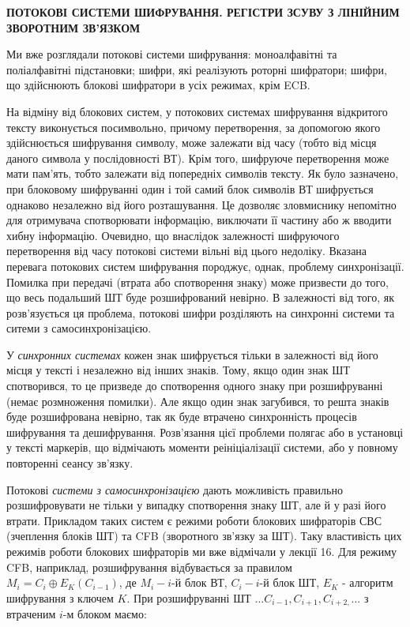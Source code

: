 \documentclass[a4paper]{article}
\newcounter{}
\begin{document}
{\centering\bfseries
ПОТОКОВІ  СИСТЕМИ  ШИФРУВАННЯ.  РЕГІСТРИ ЗСУВУ  З  ЛІНІЙНИМ  ЗВОРОТНИМ  ЗВ’ЯЗКОМ
\par}


\bigskip


\bigskip

Ми вже розглядали потокові системи шифрування: моноалфавітні та поліалфавітні
підстановки; шифри, які реалізують роторні шифратори; шифри, що здійснюють
блокові шифратори в  усіх режимах, крім ECB.

На відміну від блокових систем, у потокових системах шифрування відкритого
тексту виконується посимвольно, причому перетворення, за допомогою якого
здійснюється шифрування символу, може залежати від часу (тобто від місця даного
символа у послідовності ВТ). Крім того, шифруюче перетворення може мати
пам’ять, тобто залежати від попередніх символів тексту. Як було зазначено, при
блоковому шифруванні один і той самий блок символів ВТ шифрується однаково
незалежно від його розташування. Це дозволяє зловмиснику непомітно для
отримувача спотворювати інформацію, виключати її частину або ж вводити хибну
інформацію. Очевидно, що внаслідок залежності шифруючого перетворення від часу
потокові системи вільні від цього недоліку. Вказана перевага потокових систем
шифрування породжує, однак, проблему синхронізації. Помилка при передачі
(втрата або спотворення знаку) може призвести до того, що весь подальший ШТ
буде розшифрований невірно. В залежності від того, як розв’язується ця
проблема, потокові шифри розділяють на синхронні системи та ситеми з
самосинхронізацією.

У \textit{синхронних системах}\textbf{ }кожен знак шифрується тільки в
залежності від його місця у тексті і незалежно від інших знаків. Тому, якщо
один знак ШТ спотворився, то це призведе до спотворення одного знаку при
розшифруванні (немає розмноження помилки). Але якщо один знак загубився, то
решта знаків буде розшифрована невірно, так як буде втрачено синхронність
процесів шифрування та дешифрування. Розв’язання цієї проблеми полягає або в
установці у тексті маркерів, що відмічають моменти реініціалізації системи, або
у повному повторенні сеансу зв’язку.

Потокові \textit{системи з самосинхронізацією} дають можливість правильно
розшифровувати не тільки у випадку спотворення знаку ШТ, але й у разі його
втрати. Прикладом таких систем є режими роботи блокових шифраторів СВС 
(зчеплення блоків ШТ)  та CFB (зворотного зв’язку за ШТ). Таку властивість цих
режимів роботи блокових шифраторів ми вже відмічали у лекції 16. Для режиму
CFB, наприклад, розшифрування відбувається за правилом  
${M_{{i}}=C_{{i}}{\oplus}E_{{K}}(C_{{i-1}})}$, де  ${M_{{i}}-i}${}-й блок ВТ, 
${C_{{i}}-i}${}-й блок ШТ,  ${E_{{K}}}$ \nobreakdash- алгоритм шифрування з
ключем  ${K}$. При розшифруванні ШТ 
${\text{.}\text{.}\text{.}C_{{i-1}},C_{{i+1}},C_{{i+2,}}\text{.}\text{.}\text{.}}$
 з втраченим   ${i}${}-м блоком маємо:
\end{document}
